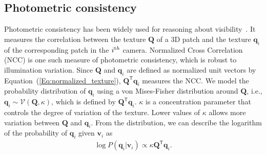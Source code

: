 
%
%

\subsection{Photometric consistency}\label{sub:Photo-Cue}
Photometric consistency has been widely used for reasoning about visibility~\cite{Snavely:2006,Frahm:2010,Furukawa:2010,Furukawa2008,Devernay2006}. It measures the correlation between the texture $\mathbf{Q}$ of a 3D patch and the texture $\mathbf{q}_i$ of the corresponding patch in the $i^{\textrm th}$ camera. Normalized Cross Correlation (NCC) is one such measure of photometric consistency, which is robust to illumination variation. Since $\mathbf{Q}$ and $\mathbf{q}_i$ are defined as normalized unit vectors by Equation~(\ref{Eq:normalized_texture}), $\mathbf{Q}^\mathsf{T}\mathbf{q}_i$ measures the NCC. We model the probability distribution of $\mathbf{q}_i$ using a von Mises-Fisher distribution around $\mathbf{Q}$, i.e., $\mathbf{q}_i\sim \mathcal{V}(\mathbf{Q}, \kappa)$, which is defined by $\mathbf{Q}^\mathsf{T}\mathbf{q}_i$. $\kappa$ is a concentration parameter that controls the degree of variation of the texture. Lower values of $\kappa$ allows more variation between $\mathbf{Q}$ and $\mathbf{q}_i$. From the distribution, we can describe the logarithm of the probability of $\mathbf{q}_i$ given $\mathbf{v}_i$ as 
\begin{eqnarray}
\log P(\mathbf{q}_i | \mathbf{v}_i) \propto \kappa\mathbf{Q}^\mathsf{T}\mathbf{q}_i.
\label{eq:eq_appearance}
\end{eqnarray}

